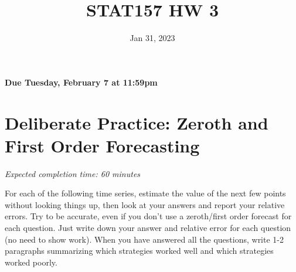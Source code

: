 \documentclass[11pt]{article}
\title{STAT157 HW 3}
\date{Jan 31, 2023}
\begin{document}
\maketitle

\hfill \textbf{Due Tuesday, February 7 at 11:59pm}

\section*{Deliberate Practice: Zeroth and First Order Forecasting}

\emph{Expected completion time: 60 minutes}

For each of the following time series, estimate the value of the next few points without looking things up, then look at your answers and report your relative errors. Try to be accurate, even if you don't use a zeroth/first order forecast for each question. Just write down your answer and relative error for each question (no need to show work). When you have answered all the questions, write 1-2 paragraphs summarizing which strategies worked well and which strategies worked poorly.
\end{document}
